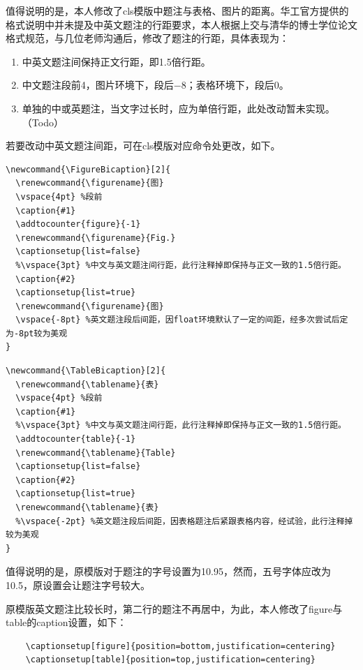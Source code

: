 值得说明的是，本人修改了cls模版中题注与表格、图片的距离。华工官方提供的格式说明中并未提及中英文题注的行距要求，本人根据上交与清华的博士学位论文格式规范，与几位老师沟通后，修改了题注的行距，具体表现为：
\begin{enumerate}
    \item 中英文题注间保持正文行距，即1.5倍行距。
    \item 中文题注段前\qty{4}{\pt}，图片环境下，段后\qty{-8}{\pt}；表格环境下，段后\qty{0}{\pt}。
    \item 单独的中或英题注，当文字过长时，应为单倍行距，此处改动暂未实现。（Todo）
\end{enumerate}

若要改动中英文题注间距，可在cls模版对应命令处更改，如下。
\begin{lstlisting}
\newcommand{\FigureBicaption}[2]{
  \renewcommand{\figurename}{图}
  \vspace{4pt} %段前
  \caption{#1}
  \addtocounter{figure}{-1}
  \renewcommand{\figurename}{Fig.}
  \captionsetup{list=false}
  %\vspace{3pt} %中文与英文题注间行距，此行注释掉即保持与正文一致的1.5倍行距。
  \caption{#2}
  \captionsetup{list=true}
  \renewcommand{\figurename}{图}
  \vspace{-8pt} %英文题注段后间距，因float环境默认了一定的间距，经多次尝试后定为-8pt较为美观
}
\end{lstlisting}
\begin{lstlisting}
\newcommand{\TableBicaption}[2]{
  \renewcommand{\tablename}{表}
  \vspace{4pt} %段前
  \caption{#1}
  %\vspace{3pt} %中文与英文题注间行距，此行注释掉即保持与正文一致的1.5倍行距。
  \addtocounter{table}{-1}
  \renewcommand{\tablename}{Table}
  \captionsetup{list=false}
  \caption{#2}
  \captionsetup{list=true}
  \renewcommand{\tablename}{表}
  %\vspace{-2pt} %英文题注段后间距，因表格题注后紧跟表格内容，经试验，此行注释掉较为美观
}
\end{lstlisting}

值得说明的是，原模版对于题注的字号设置为\qty{10.95}{\pt}，然而，五号字体应改为\qty{10.5}{\pt}，原设置会让题注字号较大。

原模版英文题注比较长时，第二行的题注不再居中，为此，本人修改了figure与table的caption设置，如下：
\begin{lstlisting}
    \captionsetup[figure]{position=bottom,justification=centering}
    \captionsetup[table]{position=top,justification=centering}
\end{lstlisting}
